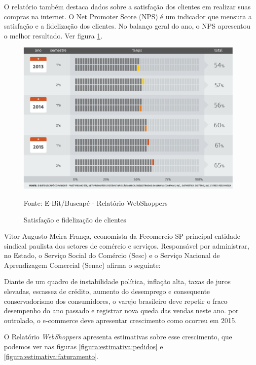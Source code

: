 \documentclass[a4paper,12pt]{monografia}
\begin{document}
O relatório também destaca dados sobre a satisfação dos clientes em realizar suas compras na internet. O Net Promoter Score (NPS) é um indicador que mensura a satisfação e a fidelização dos clientes. No balanço geral do ano, o NPS apresentou o melhor resultado. Ver figura \ref{figura:nps}.

\begin{figure}[H]
\centering
\includegraphics[width=12cm]{img/webshoppers/nps.eps}
\caption{Satisfação e fidelização de clientes}
\small{Fonte: E-Bit/Buscapé - Relatório WebShoppers}
\label{figura:nps}
\end{figure}

Vitor Augusto Meira França, economista da Fecomercio-SP principal entidade sindical paulista dos setores de comércio e serviços. Responsável por administrar, no Estado, o Serviço Social do Comércio (Sesc) e o Serviço Nacional de Aprendizagem Comercial (Senac) afirma o seguinte:

\begin{citacao}
	Diante de um quadro de instabilidade política, inflação alta, taxas de juros elevadas, escassez de crédito, aumento do desemprego e consequente conservadorismo dos consumidores, o varejo brasileiro deve repetir o fraco desempenho do ano passado e registrar nova queda das vendas neste ano. por outrolado, o e-commerce deve apresentar crescimento como ocorreu em 2015. \cite{webshoppers}
\end{citacao}

O Relatório \textit{WebShoppers} apresenta estimativas sobre esse crescimento, que podemos ver nas figuras \ref{figura:estimativa:pedidos} e \ref{figura:estimativa:faturamento}.
\end{document}
